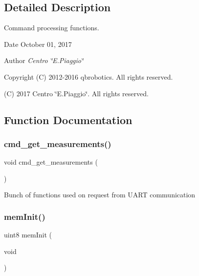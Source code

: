 \subsection{Detailed Description}
Command processing functions. 

\begin{DoxyDate}{Date}
October 01, 2017 
\end{DoxyDate}
\begin{DoxyAuthor}{Author}
{\itshape Centro \char`\"{}\+E.\+Piaggio\char`\"{}} 
\end{DoxyAuthor}
\begin{DoxyCopyright}{Copyright}
(C) 2012-\/2016 qbrobotics. All rights reserved. 

(C) 2017 Centro \char`\"{}\+E.\+Piaggio\char`\"{}. All rights reserved. 
\end{DoxyCopyright}


\subsection{Function Documentation}
\mbox{\label{command__processing_8c_af5ccd403f1d3e49c97bafd6e7713cff3}} 
\subsubsection{cmd\+\_\+get\+\_\+measurements()}
{\footnotesize\ttfamily void cmd\+\_\+get\+\_\+measurements (\begin{DoxyParamCaption}{ }\end{DoxyParamCaption})}

Bunch of functions used on request from U\+A\+RT communication \mbox{\label{command__processing_8c_a48f1d2aa212e255d0a3322e576fc8574}} 
\subsubsection{mem\+Init()}
{\footnotesize\ttfamily uint8 mem\+Init (\begin{DoxyParamCaption}\item[{void}]{ }\end{DoxyParamCaption})}

